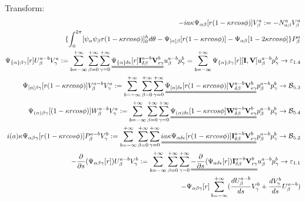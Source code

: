 \documentclass{Note}
\begin{document}
Transform:
\begin{equation}
\begin{aligned}
-ia\kappa \Psi_{\alpha\beta}[r(1-\kappa rcos\phi)]V_\beta^a:=-N_{\alpha\beta}^a V_\beta^a\\
\{\int_0^{2\pi}  [{\psi_\alpha \psi_\beta   r(1-\kappa r cos\phi)}]_0^h d\theta-\Psi_{[\alpha]\beta}[r(1-\kappa r cos\phi)]-\Psi_{\alpha\beta}[1-2\kappa r cos\phi]\}P_\beta^a\\
 \Psi_{\{\alpha\}\beta\gamma} [r]U_\beta^{a-b}V_\gamma^a:=\sum_{b=-\infty}^{+\infty} \sum_{\beta=0}^{+\infty}\sum_{\gamma=0}^{+\infty}\uuline{ \Psi_{\{\alpha\}\delta\epsilon}[r]\textbf{I}_{\delta\beta}^{a-b}\textbf{V}_{\epsilon\gamma}^{b}}u_\beta^{a-b}p_\gamma^{b}=\sum_{b=-\infty}^{+\infty}\Psi_{\{\alpha\}\beta\gamma}[r][\textbf{I},\textbf{V}]u_\beta^{a-b}p_\gamma^{b}\rightarrow\mathcal{\varepsilon}_{1.4}\\
 \Psi_{[\alpha]\beta\gamma} [r(1-\kappa rcos\phi)]V_\beta^{a-b}V_\gamma^a:=\sum_{b=-\infty}^{+\infty} \sum_{\beta=0}^{+\infty}\sum_{\gamma=0}^{+\infty}\uuline{ \Psi_{[\alpha]\delta\epsilon}[r(1-\kappa r cos\phi)]\textbf{V}_{\delta\beta}^{a-b}\textbf{V}_{\epsilon\gamma}^{b}}p_\beta^{a-b}p_\gamma^{b}\rightarrow\mathcal{B}_{5.3}\\
\Psi_{(\alpha)\beta\gamma} [(1-\kappa rcos\phi)]W_\beta^{a-b}V_\gamma^a:=\sum_{b=-\infty}^{+\infty} \sum_{\beta=0}^{+\infty}\sum_{\gamma=0}^{+\infty}\uuline{ \Psi_{(\alpha)\delta\epsilon}[1-\kappa r cos\phi]\textbf{W}_{\delta\beta}^{a-b}\textbf{V}_{\epsilon\gamma}^{b}}p_\beta^{a-b}p_\gamma^{b}\rightarrow\mathcal{B}_{5.4}\\
 i(a)\kappa \Psi_{\alpha\beta\gamma}[r(1-\kappa r cos\phi)]P_\beta^{a-b}V_\gamma^{b}:=\sum_{b=-\infty}^{+\infty} \sum_{\beta=0}^{+\infty}\sum_{\gamma=0}^{+\infty}\uuline{ ia\kappa \Psi_{\alpha\delta\epsilon}[r(1-\kappa r cos\phi)]\textbf{I}_{\delta\beta}^{a-b}\textbf{V}_{\epsilon\gamma}^{b}}p_\beta^{a-b}p_\gamma^{b}\rightarrow\mathcal{B}_{5.2}\\
 -{{\partial }\over {\partial s}}(\Psi_{\alpha\beta\gamma}[r])U_\beta^{a-b}V_\gamma^{b}:=\sum_{b=-\infty}^{+\infty} \sum_{\beta=0}^{+\infty}\sum_{\gamma=0}^{+\infty}\uuline{-{\partial\over \partial s} (\Psi_{\alpha\delta\epsilon}[r])\textbf{I}_{\delta\beta}^{a-b}\textbf{V}_{\epsilon\gamma}^{b}}u_\beta^{a-b}p_\gamma^{b}\rightarrow\mathcal{\varepsilon}_{1.1}\\
-\Psi_{\alpha\beta\gamma}[r]\sum_{b=-\infty}^{+\infty}({{d U_\beta^{a-b} \over {d s}}V_\gamma^{b}}+{dV_\gamma^{b}\over ds}U_\beta^{a-b})\\

\end{aligned}
\end{equation}
\end{document}
